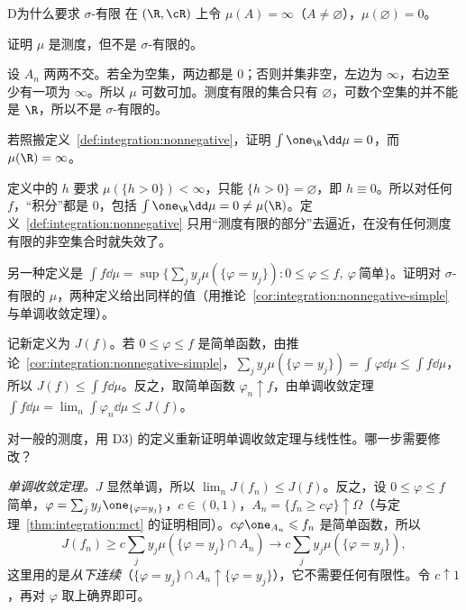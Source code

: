 \thinkingpart

\begin{probleme}[问题]{D}{为什么要求 \texorpdfstring{$\sigma$}{σ}-有限}
在 $(\R,\cR)$ 上令 $\mu(A)=\infty$（$A\neq\varnothing$），$\mu(\varnothing)=0$。
\begin{questions}
\item 证明 $\mu$ 是测度，但不是 $\sigma$-有限的。
\begin{solution}
设 $A_n$ 两两不交。若全为空集，两边都是 $0$；否则并集非空，左边为 $\infty$，右边至少有一项为 $\infty$。所以 $\mu$ 可数可加。测度有限的集合只有 $\varnothing$，可数个空集的并不能是 $\R$，所以不是 $\sigma$-有限的。
\end{solution}
\item 若照搬定义~\ref{def:integration:nonnegative}，证明 $\int\one_\R\dd\mu=0$，而 $\mu(\R)=\infty$。
\begin{solution}
定义中的 $h$ 要求 $\mu(\{h>0\})<\infty$，只能 $\{h>0\}=\varnothing$，即 $h\equiv0$。所以对任何 $f$，“积分”都是 $0$，包括 $\int\one_\R\dd\mu=0\neq\mu(\R)$。定义~\ref{def:integration:nonnegative} 只用“测度有限的部分”去逼近，在没有任何测度有限的非空集合时就失效了。
\end{solution}
\item 另一种定义是 $\int f\dd\mu=\sup\{\sum_jy_j\mu(\{\varphi=y_j\}):0\leqslant\varphi\leqslant f,\ \varphi\ \text{简单}\}$。证明对 $\sigma$-有限的 $\mu$，两种定义给出同样的值（用推论~\ref{cor:integration:nonnegative-simple} 与单调收敛定理）。
\begin{solution}
记新定义为 $J(f)$。若 $0\leqslant\varphi\leqslant f$ 是简单函数，由推论~\ref{cor:integration:nonnegative-simple}，$\sum_jy_j\mu(\{\varphi=y_j\})=\int\varphi\dd\mu\leqslant\int f\dd\mu$，所以 $J(f)\leqslant\int f\dd\mu$。反之，取简单函数 $\varphi_n\uparrow f$，由单调收敛定理 $\int f\dd\mu=\lim_n\int\varphi_n\dd\mu\leqslant J(f)$。
\end{solution}
\item 对一般的测度，用 D3) 的定义重新证明单调收敛定理与线性性。哪一步需要修改？
\begin{solution}
\emph{单调收敛定理。}$J$ 显然单调，所以 $\lim_nJ(f_n)\leqslant J(f)$。反之，设 $0\leqslant\varphi\leqslant f$ 简单，$\varphi=\sum_jy_j\one_{\{\varphi=y_j\}}$，$c\in(0,1)$，$A_n=\{f_n\geqslant c\varphi\}\uparrow\Omega$（与定理~\ref{thm:integration:mct} 的证明相同）。$c\varphi\one_{A_n}\leqslant f_n$ 是简单函数，所以
\[
J(f_n)\geqslant c\sum_jy_j\mu(\{\varphi=y_j\}\cap A_n)\to c\sum_jy_j\mu(\{\varphi=y_j\}),
\]
这里用的是\emph{从下连续}（$\{\varphi=y_j\}\cap A_n\uparrow\{\varphi=y_j\}$），它不需要任何有限性。令 $c\uparrow1$，再对 $\varphi$ 取上确界即可。


\end{solution}
\end{questions}
\end{probleme}
